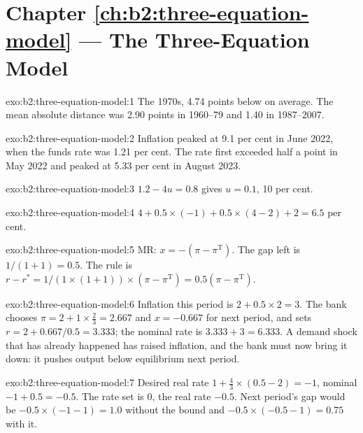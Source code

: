 \section*{Chapter \ref{ch:b2:three-equation-model} --- The Three-Equation Model}

\begin{solution}{exo:b2:three-equation-model:1}
The 1970s, 4.74 points below on average. The mean absolute distance was 2.90 points in 1960--79 and 1.40 in 1987--2007.
\end{solution}

\begin{solution}{exo:b2:three-equation-model:2}
Inflation peaked at 9.1 per cent in June 2022, when the funds rate was 1.21 per cent. The rate first exceeded half a point in May 2022
and peaked at 5.33 per cent in August 2023.
\end{solution}

\begin{solution}{exo:b2:three-equation-model:3}
$1.2 - 4u = 0.8$ gives $u = 0.1$, 10 per cent.
\end{solution}

\begin{solution}{exo:b2:three-equation-model:4}
$4 + 0.5 \times (-1) + 0.5 \times (4 - 2) + 2 = 6.5$ per cent.
\end{solution}

\begin{solution}{exo:b2:three-equation-model:5}
MR: $x = -(\pi - \pi^{\mathrm T})$. The gap left is $1/(1 + 1) = 0.5$. The rule is $r - r^* = 1/(1 \times (1 + 1)) \times (\pi - \pi^{\mathrm T}) = 0.5(\pi - \pi^{\mathrm T})$.
\end{solution}

\begin{solution}{exo:b2:three-equation-model:6}
Inflation this period is $2 + 0.5 \times 2 = 3$. The bank chooses $\pi = 2 + 1 \times \tfrac23 = 2.667$ and $x = -0.667$ for next period, and sets $r = 2 + 0.667/0.5 = 3.333$; the nominal rate is $3.333 + 3 = 6.333$.
A demand shock that has already happened has raised inflation, and the bank must now bring it down: it pushes output below
equilibrium next period.
\end{solution}

\begin{solution}{exo:b2:three-equation-model:7}
Desired real rate $1 + \tfrac43 \times (0.5 - 2) = -1$, nominal $-1 + 0.5 = -0.5$. The rate set is 0, the real rate $-0.5$. Next period's gap would be $-0.5 \times (-1 - 1) = 1.0$ without the bound and $-0.5 \times (-0.5 - 1) = 0.75$ with it.
\end{solution}

